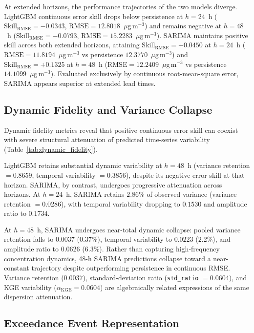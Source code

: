 \documentclass[12pt]{article}
\begin{document}
At extended horizons, the performance trajectories of the two models diverge. LightGBM continuous error skill drops below persistence at $h = 24$~h ($\mathrm{Skill}_\mathrm{RMSE} = -0.0343$, $\mathrm{RMSE} = 12.8018$~$\mu$g\,m$^{-3}$) and remains negative at $h = 48$~h ($\mathrm{Skill}_\mathrm{RMSE} = -0.0793$, $\mathrm{RMSE} = 15.2283$~$\mu$g\,m$^{-3}$). SARIMA maintains positive skill across both extended horizons, attaining $\mathrm{Skill}_\mathrm{RMSE} = +0.0450$ at $h = 24$~h ($\mathrm{RMSE} = 11.8194$~$\mu$g\,m$^{-3}$ vs persistence $12.3770$~$\mu$g\,m$^{-3}$) and $\mathrm{Skill}_\mathrm{RMSE} = +0.1325$ at $h = 48$~h ($\mathrm{RMSE} = 12.2409$~$\mu$g\,m$^{-3}$ vs persistence $14.1099$~$\mu$g\,m$^{-3}$). Evaluated exclusively by continuous root-mean-square error, SARIMA appears superior at extended lead times.

\subsection{Dynamic Fidelity and Variance Collapse}
\label{sec:results_dynamic_fidelity}

Dynamic fidelity metrics reveal that positive continuous error skill can coexist with severe structural attenuation of predicted time-series variability (Table~\ref{tab:dynamic_fidelity}).

LightGBM retains substantial dynamic variability at $h = 48$~h (variance retention $= 0.8659$, temporal variability $= 0.3856$), despite its negative error skill at that horizon. SARIMA, by contrast, undergoes progressive attenuation across horizons. At $h = 24$~h, SARIMA retains $2.86\%$ of observed variance (variance retention $= 0.0286$), with temporal variability dropping to $0.1530$ and amplitude ratio to $0.1734$.

At $h = 48$~h, SARIMA undergoes near-total dynamic collapse: pooled variance retention falls to $\mathbf{0.0037}$ ($\mathbf{0.37\%}$), temporal variability to $\mathbf{0.0223}$ ($2.2\%$), and amplitude ratio to $\mathbf{0.0626}$ ($6.3\%$). Rather than capturing high-frequency concentration dynamics, 48-h SARIMA predictions collapse toward a near-constant trajectory despite outperforming persistence in continuous RMSE. Variance retention ($0.0037$), standard-deviation ratio (\texttt{std\_ratio} $= 0.0604$), and KGE variability ($\alpha_\mathrm{KGE} = 0.0604$) are algebraically related expressions of the same dispersion attenuation.

\subsection{Exceedance Event Representation}
\label{sec:results_event_representation}
\end{document}
